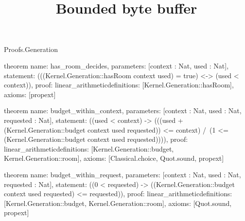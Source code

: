 \begin{lexlean}{Proofs.Generation}
\title{Bounded byte buffer}
\begin{semanticmodule}
theorem{
  name: has_room_decides,
  parameters: [context : Nat, used : Nat],
  statement: (((Kernel.Generation::hasRoom context used) = true) <-> (used < context)),
  proof: linear_arithmetic{definitions: [Kernel.Generation::hasRoom]},
  axioms: [propext]
}

theorem{
  name: budget_within_context,
  parameters: [context : Nat, used : Nat, requested : Nat],
  statement: ((used < context) -> (((used + (Kernel.Generation::budget context used requested)) <= context) /\ (1 <= (Kernel.Generation::budget context used requested)))),
  proof: linear_arithmetic{definitions: [Kernel.Generation::budget, Kernel.Generation::room]},
  axioms: [Classical.choice, Quot.sound, propext]
}

theorem{
  name: budget_within_request,
  parameters: [context : Nat, used : Nat, requested : Nat],
  statement: ((0 < requested) -> ((Kernel.Generation::budget context used requested) <= requested)),
  proof: linear_arithmetic{definitions: [Kernel.Generation::budget, Kernel.Generation::room]},
  axioms: [Quot.sound, propext]
}
\end{semanticmodule}
\end{lexlean}
